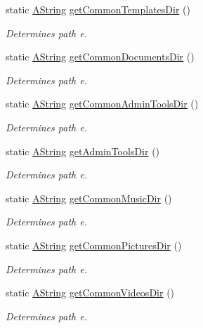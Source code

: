 \begin{DoxyCompactItemize}
static \mbox{\hyperlink{class_a_string}{A\+String}} \mbox{\hyperlink{class_dir_aa8156c23b2330137f8a900a72e6a23a6}{get\+Common\+Templates\+Dir}} ()
\begin{DoxyCompactList}\small\item\em Determines path e. \end{DoxyCompactList}\item 
static \mbox{\hyperlink{class_a_string}{A\+String}} \mbox{\hyperlink{class_dir_a90740eddc387b59ac763d37ba3f6cc41}{get\+Common\+Documents\+Dir}} ()
\begin{DoxyCompactList}\small\item\em Determines path e. \end{DoxyCompactList}\item 
static \mbox{\hyperlink{class_a_string}{A\+String}} \mbox{\hyperlink{class_dir_abfcb8baffd5c395ddaabc62a2a444de6}{get\+Common\+Admin\+Tools\+Dir}} ()
\begin{DoxyCompactList}\small\item\em Determines path e. \end{DoxyCompactList}\item 
static \mbox{\hyperlink{class_a_string}{A\+String}} \mbox{\hyperlink{class_dir_af6942740610aa474213806c78a206467}{get\+Admin\+Tools\+Dir}} ()
\begin{DoxyCompactList}\small\item\em Determines path e. \end{DoxyCompactList}\item 
static \mbox{\hyperlink{class_a_string}{A\+String}} \mbox{\hyperlink{class_dir_a7642f62fa4dd296f4ce84461f1977229}{get\+Common\+Music\+Dir}} ()
\begin{DoxyCompactList}\small\item\em Determines path e. \end{DoxyCompactList}\item 
static \mbox{\hyperlink{class_a_string}{A\+String}} \mbox{\hyperlink{class_dir_a4a09b54259500e114930201594c3ea11}{get\+Common\+Pictures\+Dir}} ()
\begin{DoxyCompactList}\small\item\em Determines path e. \end{DoxyCompactList}\item 
static \mbox{\hyperlink{class_a_string}{A\+String}} \mbox{\hyperlink{class_dir_aa5898bb30aa94b0fa079e639351a3d3c}{get\+Common\+Videos\+Dir}} ()
\begin{DoxyCompactList}\small\item\em Determines path e. \end{DoxyCompactList}\item 

\end{DoxyCompactItemize}
